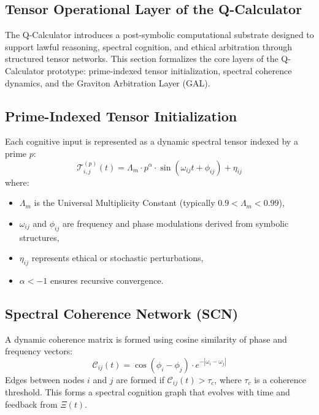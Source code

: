 \documentclass[12pt]{article}
\begin{document}
\begin{itemize}
\section{Tensor Operational Layer of the Q-Calculator}

The Q-Calculator introduces a post-symbolic computational substrate designed to support lawful reasoning, spectral cognition, and ethical arbitration through structured tensor networks. This section formalizes the core layers of the Q-Calculator prototype: prime-indexed tensor initialization, spectral coherence dynamics, and the Graviton Arbitration Layer (GAL).

\subsection{Prime-Indexed Tensor Initialization}
Each cognitive input is represented as a dynamic spectral tensor indexed by a prime \( p \):
\begin{equation}
    \mathcal{T}^{(p)}_{i,j}(t) = \Lambda_m \cdot p^\alpha \cdot \sin(\omega_{ij} t + \phi_{ij}) + \eta_{ij}
\end{equation}
where:
\begin{itemize}
    \item \( \Lambda_m \) is the Universal Multiplicity Constant (typically \( 0.9 < \Lambda_m < 0.99 \)),
    \item \( \omega_{ij} \) and \( \phi_{ij} \) are frequency and phase modulations derived from symbolic structures,
    \item \( \eta_{ij} \) represents ethical or stochastic perturbations,
    \item \( \alpha < -1 \) ensures recursive convergence.
\end{itemize}

\subsection{Spectral Coherence Network (SCN)}
A dynamic coherence matrix is formed using cosine similarity of phase and frequency vectors:
\begin{equation}
    \mathcal{C}_{ij}(t) = \cos(\phi_i - \phi_j) \cdot e^{-\left| \omega_i - \omega_j \right|}
\end{equation}
Edges between nodes \( i \) and \( j \) are formed if \( \mathcal{C}_{ij}(t) > \tau_c \), where \( \tau_c \) is a coherence threshold. This forms a spectral cognition graph that evolves with time and feedback from \( \Xi(t) \).


\end{itemize}
\end{document}
